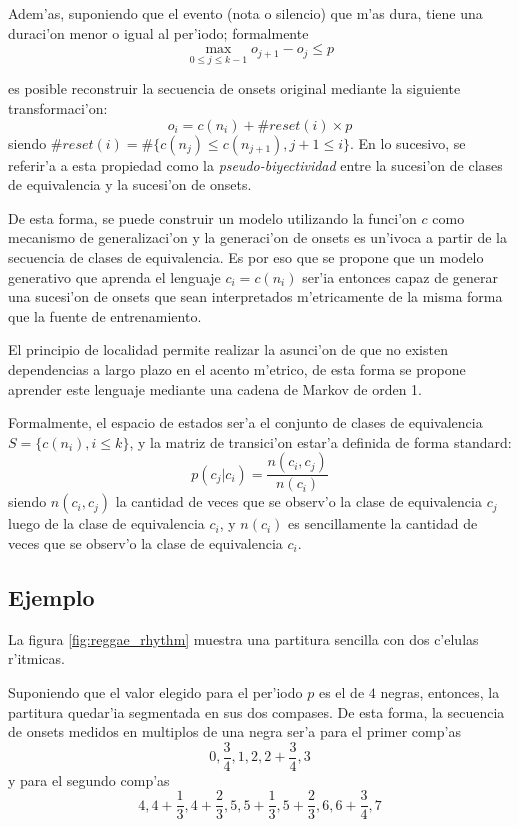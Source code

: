 Adem'as, suponiendo que el evento (nota o silencio) que m'as dura, tiene una duraci'on menor o igual al per'iodo; formalmente 
$$\max_{0\leq j \leq k-1}o_{j+1}-o_j \leq p$$ 

es posible reconstruir la secuencia de onsets original mediante la siguiente transformaci'on:
$$o_i=c(n_i) + \#reset(i)\times p$$ siendo $\#reset(i)=\#\{c(n_j) \leq c(n_{j+1}), j+1 \leq i\}$. En lo sucesivo, se referir'a a esta propiedad como la \emph{pseudo-biyectividad} 
entre la sucesi'on de clases de equivalencia y la sucesi'on de onsets.

De esta forma, se puede construir un modelo utilizando la funci'on $c$ como mecanismo de generalizaci'on y la generaci'on de onsets es un'ivoca a partir de la secuencia de 
clases de equivalencia. Es por eso que se propone que un modelo generativo que aprenda el lenguaje $c_i=c(n_i)$ ser'ia entonces capaz de generar una sucesi'on de onsets 
que sean interpretados m'etricamente de la misma forma que la fuente de entrenamiento. 

El principio de localidad permite realizar la asunci'on de que no existen dependencias a largo plazo en el acento m'etrico, de esta forma se propone aprender este lenguaje mediante
una cadena de Markov de orden 1. 

Formalmente, el espacio de estados ser'a el conjunto de clases de equivalencia $S=\{c(n_i), i\leq k \}$, y la matriz de transici'on estar'a definida de forma standard:
$$p(c_j|c_i) = \frac{n(c_i, c_j)}{n(c_i)}$$
siendo $n(c_i, c_j)$ la cantidad de veces que se observ'o la clase de equivalencia $c_j$ luego de la clase de equivalencia $c_i$, y $n(c_i)$ es sencillamente la cantidad de 
veces que se observ'o la clase de equivalencia $c_i$.

\subsection{Ejemplo}
La figura \ref{fig:reggae_rhythm}  muestra una partitura sencilla con dos c'elulas r'itmicas.
\begin{imagen}
\end{imagen}

Suponiendo que el valor elegido para el per'iodo $p$ es el de $4$ negras, entonces, la partitura quedar'ia segmentada en sus dos compases. 
De esta forma, la secuencia de onsets medidos en multiplos de una negra ser'a para el primer comp'as
$$0, \frac{3}{4}, 1, 2, 2+\frac{3}{4}, 3$$
y para el segundo comp'as 
$$4, 4+\frac{1}{3}, 4+\frac{2}{3}, 5, 5+\frac{1}{3}, 5+\frac{2}{3}, 6, 6+\frac{3}{4}, 7$$

